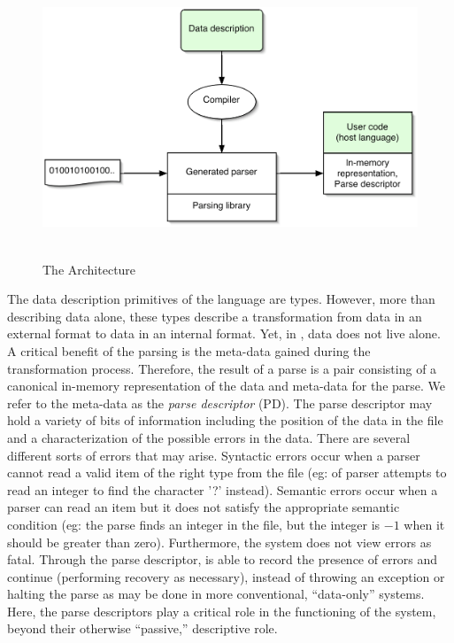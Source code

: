 \documentclass{entcs}
\begin{document}
\begin{figure}[tp]
  \includegraphics[height=3in,width=5in]{architecture.eps}
\label{fig:pads-arch}
\caption{The \pads{} Architecture}
\end{figure}

The data description primitives of the \pads{} language are types.
However, more than describing data alone, these types describe a
transformation from data in an external format to data in an internal
format.  Yet, in \pads{}, data does not live alone. A critical benefit
of the parsing is the meta-data gained during the transformation
process.  Therefore, the result of a parse is a pair consisting of a
canonical in-memory representation of the data and meta-data for the
parse.  We refer to the meta-data as the {\em parse descriptor} (PD).
The parse descriptor may hold a variety of bits of information
including the position of the data in the file and a characterization
of the possible errors in the data.  There are several different sorts
of errors that may arise.  Syntactic errors occur when a parser cannot
read a valid item of the right type from the file (eg: of parser
attempts to read an integer to find the character '?'  instead).
Semantic errors occur when a parser can read an item but it does not
satisfy the appropriate semantic condition (eg: the parse finds an
integer in the file, but the integer is $-1$ when it should be greater
than zero).  Furthermore, the \pads{} system does not view errors as
fatal. Through the parse descriptor, \pads{} is able to record the
presence of errors and continue (performing recovery as necessary),
instead of throwing an exception or halting the parse as may be done
in more conventional, ``data-only'' systems. Here, the parse
descriptors play a critical role in the functioning of the system,
beyond their otherwise ``passive,'' descriptive role.
\end{document}
